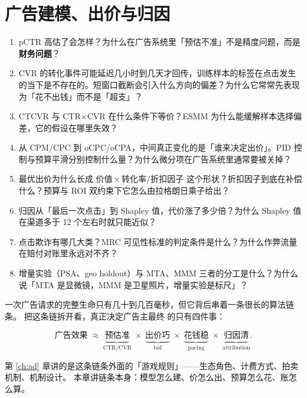 \chapter{广告建模、出价与归因}
\label{ch:admodel}

\begin{insight}[本章要解决的问题]
\begin{enumerate}
  \item pCTR 高估了会怎样？为什么在广告系统里「预估不准」不是精度问题，而是\textbf{财务问题}？
  \item CVR 的转化事件可能延迟几小时到几天才回传，训练样本的标签在点击发生的当下是不存在的。短窗口截断会引入什么方向的偏差？为什么它常常先表现为「花不出钱」而不是「超支」？
  \item CTCVR 与 CTR$\times$CVR 在什么条件下等价？ESMM 为什么能缓解样本选择偏差，它的假设在哪里失效？
  \item 从 CPM/CPC 到 oCPC/oCPA，中间真正变化的是「谁来决定出价」。PID 控制与预算平滑分别控制什么量？为什么微分项在广告系统里通常要被关掉？
  \item 最优出价为什么长成 $\text{价值}\times\text{转化率}/\text{折扣因子}$ 这个形状？折扣因子到底在补偿什么？预算与 ROI 双约束下它怎么由拉格朗日乘子给出？
  \item 归因从「最后一次点击」到 Shapley 值，代价涨了多少倍？为什么 Shapley 值在渠道多于 12 个左右时就只能近似？
  \item 点击欺诈有哪几大类？MRC 可见性标准的判定条件是什么？为什么作弊流量在赔付对账里永远对不齐？
  \item 增量实验（PSA、geo holdout）与 MTA、MMM 三者的分工是什么？为什么说「MTA 是显微镜，MMM 是卫星照片，增量实验是标尺」？
\end{enumerate}
\end{insight}

一次广告请求的完整生命只有几十到几百毫秒，但它背后串着一条很长的算法链条。
把这条链拆开看，真正决定广告主最终  的只有四件事：

\begin{equation}
\text{广告效果} \;\approx\; \underbrace{\text{预估准}}_{\text{CTR/CVR}} \;\times\; \underbrace{\text{出价巧}}_{\text{bid}} \;\times\; \underbrace{\text{花钱稳}}_{\text{pacing}} \;\times\; \underbrace{\text{归因清}}_{\text{attribution}} .
\label{eq:ad-chain}
\end{equation}

第 \cref{ch:ad} 章讲的是这条链条外面的「游戏规则」——生态角色、计费方式、拍卖机制、机制设计。
本章讲链条本身：模型怎么建、价怎么出、预算怎么花、账怎么算。

